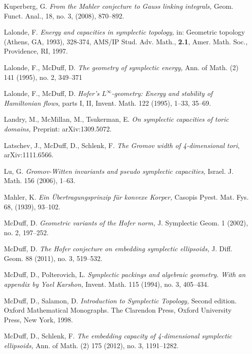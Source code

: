 \documentclass{icmart}
\theoremstyle{definition}
\begin{document}
\begin{thebibliography}{7}
 Kuperberg, G. {\it From the Mahler conjecture to Gauss linking
integrals,} Geom. Funct. Anal., 18, no. 3, (2008),
870--892.

 Lalonde, F. {\it Energy and capacities in symplectic
topology,} in: Geometric topology (Athens, GA, 1993), 328-374, AMS/IP
Stud. Adv. Math., {\bf 2.1}, Amer. Math. Soc., Providence, RI, 1997.

  Lalonde, F., McDuff, D. {\it The geometry of symplectic energy,}  Ann. of Math. (2) 141 (1995), no. 2, 349--371

Lalonde, F., McDuff, D. {\it Hofer's $L^{\infty}$-geometry: Energy and
stability of Hamiltonian flows}, parts I, II, Invent. Math. 122
(1995), 1--33, 35--69.

 Landry, M.,  McMillan, M., Tsukerman, E. {\it  On symplectic capacities of toric domains,} Preprint: arXiv:1309.5072.

 Latschev, J., McDuff, D., Schlenk, F. {\it The Gromov width of 4-dimensional tori}, arXiv:1111.6566.


 Lu, G. {\it  Gromov-Witten invariants and pseudo symplectic capacities,}  Israel. J.
Math. 156 (2006), 1--63.


 Mahler, K. {\it Ein \"Ubertragungsprinzip f\"ur konvexe
Korper,} Casopis Pyest. Mat. Fys. 68, (1939), 93--102.


 McDuff, D. {\it Geometric variants of the Hofer norm,}  J. Symplectic Geom. 1  (2002),  no. 2, 197--252.



 McDuff, D. {\it The Hofer conjecture on embedding symplectic ellipsoids,}  J. Diff. Geom. 88 (2011), no. 3, 519--532. 


 McDuff, D.,  Polterovich, L. {\it Symplectic packings and algebraic geometry. With an appendix by Yael Karshon,} Invent. Math. 115 (1994), no. 3, 405--434.

 McDuff, D., Salamon, D. {\it Introduction to Symplectic Topology,} Second edition. Oxford Mathematical Monographs. The Clarendon Press, Oxford University Press, New York, 1998.

 McDuff, D.,  Schlenk, F. {\it The embedding capacity of 4-dimensional symplectic ellipsoids,}
Ann. of Math. (2) 175 (2012), no. 3, 1191--1282. 



\end{thebibliography}
\end{document}
